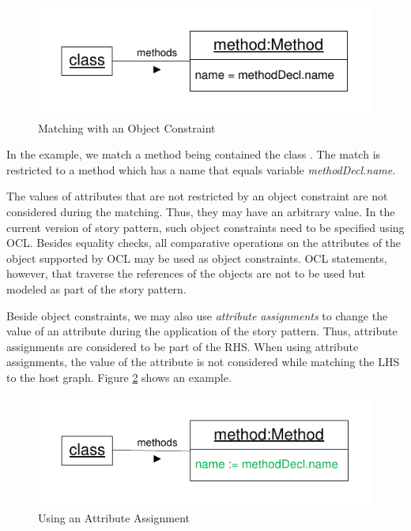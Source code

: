 \begin{figure}[htbp]
  \centering
  \includegraphics[scale=1]{figures/ObjectConstraint}
  \caption{Matching with an Object Constraint}
  \label{fig:objectConstraint}
\end{figure}

In the example, we match a method being contained the class . The match is restricted to a method which has a name that equals variable \emph{methodDecl.name}.

The values of attributes that are not restricted by an object constraint are not considered during the matching. Thus, they may have an arbitrary value. In the current version of story pattern, such object constraints need to be specified using OCL. Besides equality checks, all comparative operations on the attributes of the object supported by OCL may be used as object constraints. OCL statements, however, that traverse the references of the objects are not to be used but modeled as part of the story pattern.

Beside object constraints, we may also use \emph{attribute assignments} to change the value of an attribute during the application of the story pattern. Thus, attribute assignments are considered to be part of the RHS. When using attribute assignments, the value of the attribute is not considered while matching the LHS to the host graph. Figure \ref{fig:attributeAssignment} shows an example.

\begin{figure}[htbp]
  \centering
  \includegraphics[scale=1]{figures/AttributeAssignment}
  \caption{Using an Attribute Assignment}
  \label{fig:attributeAssignment}
\end{figure}

